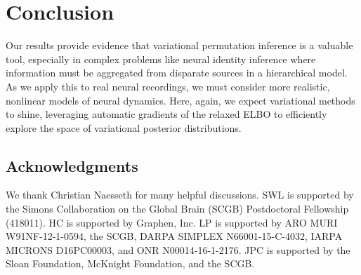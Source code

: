 \documentclass[twoside]{article}
\begin{document}
\section{Conclusion}

Our results provide evidence that variational permutation
inference is a valuable tool, especially in complex
problems like neural identity inference where information must be
aggregated from disparate sources in a hierarchical model.  As we
apply this to real neural recordings, we must consider more realistic,
nonlinear models of neural dynamics. Here, again, we expect
variational methods to shine, leveraging automatic gradients of the
relaxed ELBO to efficiently explore the space of variational posterior
distributions.

\subsection*{Acknowledgments}
We thank Christian Naesseth for many helpful discussions.  SWL is
supported by the Simons Collaboration on the Global Brain (SCGB)
Postdoctoral Fellowship (418011).
HC is supported by Graphen, Inc.
LP is supported by ARO MURI
W91NF-12-1-0594, the SCGB, DARPA SIMPLEX N66001-15-C-4032, IARPA
MICRONS D16PC00003, and ONR N00014-16-1-2176.  JPC is supported by the
Sloan Foundation, McKnight Foundation, and the SCGB.





\pagebreak 
\appendix


\end{document}
